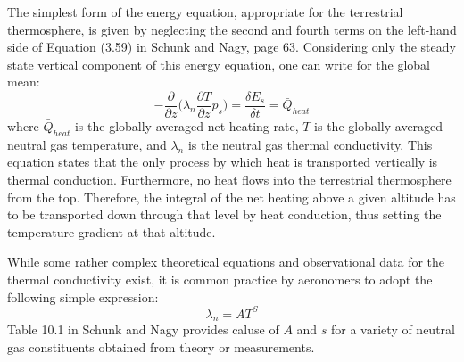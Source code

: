 \documentclass[10pt]{article}
\begin{document}
\begin{multicols}{2}
The simplest form of the energy equation, appropriate for the terrestrial thermosphere, is given by neglecting the second and fourth terms on the left-hand side of Equation (3.59) in Schunk and Nagy, page 63. Considering only the steady state vertical component of this energy equation, one can write for the global mean:
\begin{equation} \label{eq:energy_equation}
-\frac{\partial}{\partial z}\bigg(\lambda_n \frac{\partial T}{\partial z}p_s\bigg) = \frac{\delta E_s}{\delta t} = \bar Q_{heat}
\end{equation}
\noindent where $\bar Q_{heat}$ is the globally averaged net heating rate, $T$ is the globally averaged neutral gas temperature, and $\lambda_n$ is the neutral gas thermal conductivity. This equation states that the only process by which heat is transported vertically is thermal conduction. Furthermore, no heat flows into the terrestrial thermosphere from the top. Therefore, the integral of the net heating above a given altitude has to be transported down through that level by heat conduction, thus setting the temperature gradient at that altitude. 

While some rather complex theoretical equations and observational data for the thermal conductivity exist, it is common practice by aeronomers to adopt the following simple expression:
\begin{equation} 
\lambda_n = AT^S
\end{equation}
\noindent Table 10.1 in Schunk and Nagy provides caluse of $A$ and $s$ for a variety of neutral gas constituents obtained from theory or measurements.


\end{multicols}
\end{document}
